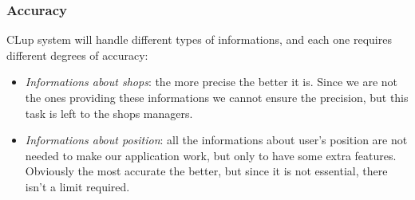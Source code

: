 \subsubsection{Accuracy}
\label{subsubsect:accuracy}

CLup system will handle different types of informations, and each one requires different degrees of accuracy:
\begin{itemize}[topsep=0pt]
    \item \textit{Informations about shops}: the more precise the better it is. Since we are not the ones providing these informations we cannot ensure the precision, but this task is left to the shops managers.
    \item \textit{Informations about position}: all the informations about user's position are not needed to make our application work, but only to have some extra features. Obviously the most accurate the better, but since it is not essential, there isn't a limit required.
\end{itemize}